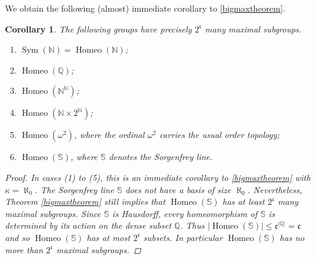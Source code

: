 \documentclass[11pt]{amsart}
\newtheorem{corollary}[theorem]{Corollary}
\theoremstyle{definition}
\newcommand{\Homeo}{\operatorname{Homeo}}
\newcommand{\N}{\mathbb N}
\newcommand{\Q}{\mathbb Q}
\newcommand{\Sym}{\operatorname{Sym}}
\begin{document}
We obtain the following (almost) immediate corollary to \cref{bigmaxtheorem}.



\begin{corollary}\label{cor:manyexamples}
    The following groups have precisely $2^{\mathfrak{c}}$ many maximal subgroups.
    \begin{enumerate}[\rm(1)]
        \item $\Sym(\N)=\Homeo(\N)$;
        \item $\Homeo(\Q)$;
        \item $\Homeo(\N^{\N})$;
        \item $\Homeo(\N\times 2^\N)$;
        \item $\Homeo(\omega^2)$, where the ordinal $\omega^2$ carries the usual order topology;
        \item $\Homeo(\mathbb{S})$, where $\mathbb{S}$ denotes the Sorgenfrey line.
    \end{enumerate}
    \begin{proof}
In cases (1) to (5), this is an immediate corollary to \cref{bigmaxtheorem} with $\kappa=\aleph_0$. %
The Sorgenfrey line $\mathbb{S}$ does not have a basis of size $\aleph_0$. Nevertheless, Theorem \ref{bigmaxtheorem} still implies that $\Homeo(\mathbb{S})$ has at least $2^{\mathfrak{c}}$ many maximal subgroups. Since $\mathbb{S}$ is Hausdorff, every homeomorphism of $\mathbb{S}$ is determined by its action on the dense subset $\Q$. Thus $|\Homeo(\mathbb{S})| \leq \mathfrak{c}^{|\Q|}=\mathfrak{c}$ and so $\Homeo(\mathbb{S})$ has at most $2^{\mathfrak{c}}$ subsets. In particular $\Homeo(\mathbb{S})$ has no more than $2^{\mathfrak{c}}$ maximal subgroups.
    \end{proof}
\end{corollary}
\end{document}
